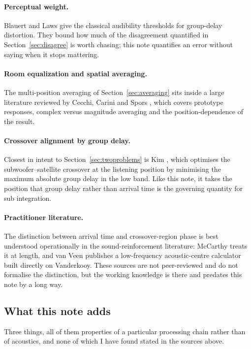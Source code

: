 \documentclass[11pt,a4paper]{article}
\begin{document}
\paragraph{Perceptual weight.} Blauert and Laws \cite{Blauert1978} give the
classical audibility thresholds for group-delay distortion. They bound how much
of the disagreement quantified in Section~\ref{sec:disagree} is worth chasing;
this note quantifies an error without saying when it stops mattering.

\paragraph{Room equalization and spatial averaging.} The multi-position
averaging of Section~\ref{sec:averaging} sits inside a large literature reviewed
by Cecchi, Carini and Spors \cite{Cecchi2018}, which covers prototype responses,
complex versus magnitude averaging and the position-dependence of the result.

\paragraph{Crossover alignment by group delay.} Closest in intent to
Section~\ref{sec:twoproblems} is Kim \cite{Kim2025}, which optimises the
subwoofer--satellite crossover at the listening position by minimising the
maximum absolute group delay in the low band. Like this note, it takes the
position that group delay rather than arrival time is the governing quantity for
sub integration.

\paragraph{Practitioner literature.} The distinction between arrival time and
crossover-region phase is best understood operationally in the sound-reinforcement
literature: McCarthy \cite{McCarthy2016} treats it at length, and van Veen
\cite{vanVeen} publishes a low-frequency acoustic-centre calculator built
directly on Vanderkooy. These sources are not peer-reviewed and do not formalise
the distinction, but the working knowledge is there and predates this note by a
long way.

\subsection{What this note adds}

Three things, all of them properties of a particular processing chain rather
than of acoustics, and none of which I have found stated in the sources above.
\end{document}

